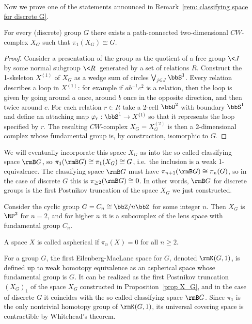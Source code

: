 Now we prove one of the statements announced in Remark~\ref{rem: classifying space for discrete G}. 
\begin{prop}\label{prop X_G}
    For every (discrete) group $G$ there exists a path-connected two-dimensional $CW$-complex $X_G$ such that $\pi_1(X_G)\cong G$.
\end{prop}
\begin{proof}
    Consider a presentation of the group as the quotient of a free group $\<J\>$ by some normal subgroup $\<R\>$ generated by a set of relations $R$. Construct the 1-skeleton $X^{(1)}$ of $X_G$ as a wedge sum of circles $\bigvee_{j\in J}\bbS^1$. Every relation describes a loop in $X^{(1)}$: for example if $ab^{-1}c^2$ is a relation, then the loop is given by going around $a$ once, around $b$ once in the opposite direction, and then twice around $c$. For each relation $r\in R$ take a 2-cell $\bbD^2$ with boundary $\bbS^{1}$ and define an attaching map $\varphi_r:\bbS^1\to X^{(1)}$ so that it represents the loop specified by $r$. The resulting $CW$-complex $X_G=X^{(2)}_G$ is then a 2-dimensional complex whose fundamental group is, by construction, isomorphic to $G$.
\end{proof}
We will eventually incorporate this space $X_G$ as into the so called classifying space $\rmB G$, so $\pi_1(\rmB G)\cong \pi_1(X_G)\cong G$, i.e.\ the inclusion is a weak 1-equivalence. The classifying space $\rmB G$ must have $\pi_{n+1}(\rmB G)\cong \pi_{n}(G)$, so in the case of discrete $G$ this is $\pi_{\geq 2}(\rmB G)\cong 0$. In other words, $\rmB G$ for discrete groups is the first Postnikov truncation of the space $X_G$ we just constructed.


\begin{example}
    Consider the cyclic group $G=C_n\cong \bbZ\slash n\bbZ$ for some integer $n$. Then $X_G$ is $\RP^2$ for $n=2$, and for higher $n$ it is a subcomplex of the lens space with fundamental group $C_n$.
\end{example}

\begin{defn}
    A space $X$ is called aspherical if $\pi_n(X)=0$ for all $n\geq 2$.
\end{defn}

\begin{defn}\label{def: K(G,1)}
    For a group $G$, the first Eilenberg-MacLane space for $G$, denoted $\rmK(G,1)$, is defined up to weak homotopy equivalence as an aspherical space whose fundamental group is $G$. It can be realized as the first Postnikov truncation $(X_G)_1$ of the space $X_G$ constructed in Proposition~\ref{prop X_G}, and in the case of discrete $G$ it coincides with the so called classifying space $\rmB G$. Since $\pi_1$ is the only nontrivial homotopy group of $\rmK(G,1)$, its universal covering space is contractible by Whitehead's theorem.
\end{defn}


